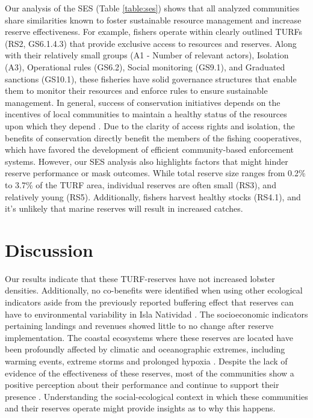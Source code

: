 \documentclass{frontiersSCNS}
\begin{document}
Our analysis of the SES (Table \ref{table:ses}) shows that all analyzed
communities share similarities known to foster sustainable resource
management and increase reserve effectiveness. For example, fishers
operate within clearly outlined TURFs (RS2, GS6.1.4.3) that provide
exclusive access to resources and reserves. Along with their relatively
small groups (A1 - Number of relevant actors), Isolation (A3),
Operational rules (GS6.2), Social monitoring (GS9.1), and Graduated
sanctions (GS10.1), these fisheries have solid governance structures
that enable them to monitor their resources and enforce rules to ensure
sustainable management. In general, success of conservation initiatives
depends on the incentives of local communities to maintain a healthy
status of the resources upon which they depend \citep{jupiter_2017}. Due
to the clarity of access rights and isolation, the benefits of
conservation directly benefit the members of the fishing cooperatives,
which have favored the development of efficient community-based
enforcement systems. However, our SES analysis also highlights factors
that might hinder reserve performance or mask outcomes. While total
reserve size ranges from 0.2\% to 3.7\% of the TURF area, individual
reserves are often small (RS3), and relatively young (RS5).
Additionally, fishers harvest healthy stocks (RS4.1), and it's unlikely
that marine reserves will result in increased catches.

\section{Discussion}\label{discussion}

Our results indicate that these TURF-reserves have not increased lobster
densities. Additionally, no co-benefits were identified when using other
ecological indicators aside from the previously reported buffering
effect that reserves can have to environmental variability in Isla
Natividad \citep{micheli_2012-EU}. The socioeconomic indicators
pertaining landings and revenues showed little to no change after
reserve implementation. The coastal ecosystems where these reserves are
located have been profoundly affected by climatic and oceanographic
extremes, including warming events, extreme storms and prolonged hypoxia
\citep{micheli_2012-EU,woodson}. Despite the lack of evidence of the
effectiveness of these reserves, most of the communities show a positive
perception about their performance and continue to support their
presence \citep{ayer_2018}. Understanding the social-ecological context
in which these communities and their reserves operate might provide
insights as to why this happens.
\end{document}
